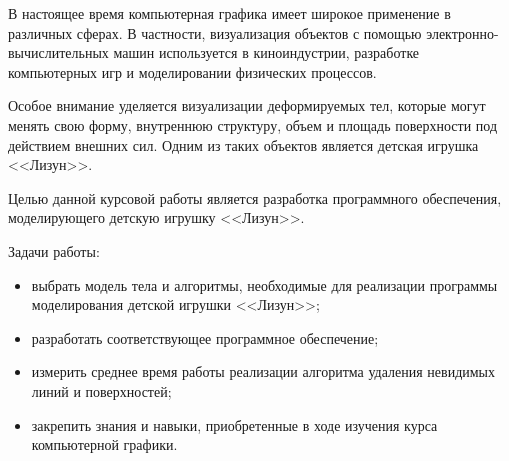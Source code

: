 
В настоящее время компьютерная графика имеет широкое применение в
различных сферах. В частности, визуализация объектов с помощью электронно-вычислительных машин используется в киноиндустрии, разработке компьютерных
игр и моделировании физических процессов.

Особое внимание уделяется визуализации деформируемых тел, которые
могут менять свою форму, внутреннюю структуру, объем и площадь поверхности
под действием внешних сил. Одним из таких объектов является детская игрушка
<<Лизун>>.

Целью данной курсовой работы является разработка программного обеспечения, моделирующего детскую игрушку <<Лизун>>.

Задачи работы:

\begin{itemize}
	\item выбрать модель тела и алгоритмы, необходимые для реализации программы моделирования детской игрушки <<Лизун>>;
	\item разработать соответствующее программное обеспечение;
	\item измерить среднее время работы реализации алгоритма удаления невидимых линий и поверхностей;
	\item закрепить знания и навыки, приобретенные в ходе изучения курса компьютерной графики.
\end{itemize}

\clearpage
